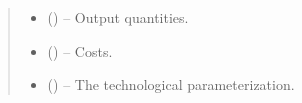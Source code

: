 \documentclass[letterpaper,10pt,english]{sphinxmanual}
\begin{document}
\begin{fulllineitems}
\begin{quote}
\begin{description}
\begin{itemize}
\item {} 
\sphinxAtStartPar
{} () – Output quantities.

\item {} 
\sphinxAtStartPar
{} () – Costs.

\item {} 
\sphinxAtStartPar
{} () – The technological parameterization.

\end{itemize}

\end{description}\end{quote}

\end{fulllineitems}

\end{document}
